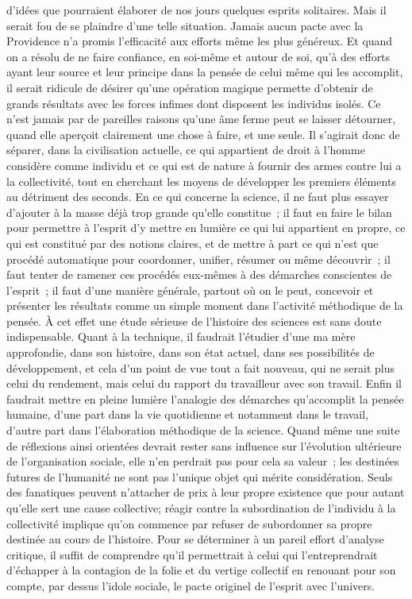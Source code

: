 \documentclass[french,twoside]{book} %
\begin{document}
d'idées que pourraient élaborer de nos jours quelques esprits solitaires. Mais il serait fou de se plaindre d'une telle situation. Jamais aucun pacte avec la Providence n'a promis l'efficacité aux efforts même les plus généreux. Et quand on a résolu de ne faire confiance, en soi-même et autour de soi, qu'à des efforts ayant leur source et leur principe dans la pensée de celui même qui les accomplit, il serait ridicule de désirer qu'une opération magique permette d'obtenir de grands résultats avec les forces infimes dont disposent les individus isolés. Ce n'est jamais par de pareilles raisons qu'une âme ferme peut se laisser détourner, quand elle aperçoit clairement une chose à faire, et une seule. Il s'agirait donc de séparer, dans la civilisation actuelle, ce qui appartient de droit à l'homme considère comme individu et ce qui est de nature à fournir des armes contre lui a la collectivité, tout en cherchant les moyens de développer les premiers éléments au détriment des seconds. En ce qui concerne la science, il ne faut plus essayer d'ajouter à la masse déjà trop grande qu'elle constitue ; il faut en faire le bilan pour permettre à l'esprit d'y mettre en lumière ce qui lui appartient en propre, ce qui est constitué par des notions claires, et de mettre à part ce qui n'est que procédé automatique pour coordonner, unifier, résumer ou même découvrir ; il faut tenter de ramener ces procédés eux-mêmes à des démarches conscientes de l'esprit ; il faut d'une manière générale, partout où on le peut, concevoir et présenter les résultats comme un simple moment dans l'activité méthodique de la pensée. À cet effet une étude sérieuse de l'histoire des sciences est sans doute indispensable. Quant à la technique, il faudrait l'étudier d'une ma mère approfondie, dans son histoire, dans son état actuel, dans ses possibilités de développement, et cela d'un point de vue tout a fait nouveau, qui ne serait plus celui du rendement, mais celui du rapport du travailleur avec son travail. Enfin il faudrait mettre en pleine lumière l'analogie des démarches qu'accomplit la pensée humaine, d'une part dans la vie quotidienne et notamment dans le travail, d'autre part dans l'élaboration méthodique de la science. Quand même une suite de réflexions ainsi orientées devrait rester sans influence sur l'évolution ultérieure de l'organisation sociale, elle n'en perdrait pas pour cela sa valeur ; les destinées futures de l'humanité ne sont pas l'unique objet qui mérite considération. Seuls des fanatiques peuvent n'attacher de prix à leur propre existence que pour autant qu'elle sert une cause collective; réagir contre la subordination de l'individu à la collectivité implique qu'on commence par refuser de subordonner sa propre destinée au cours de l'histoire. Pour se déterminer à un pareil effort d'analyse critique, il suffit de comprendre qu'il permettrait à celui qui l'entreprendrait d'échapper à la contagion de la folie et du vertige collectif en renouant pour son compte, par dessus l'idole sociale, le pacte originel de l'esprit avec l'univers.\par
\end{document}
